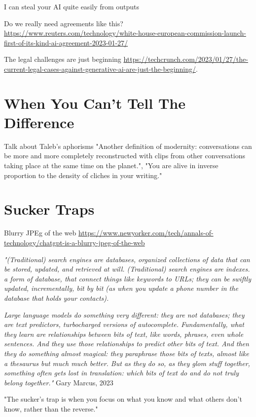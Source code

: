 I can steal your AI quite easily from outputs

Do we really need agreements like this? \url{https://www.reuters.com/technology/white-house-european-commission-launch-first-of-its-kind-ai-agreement-2023-01-27/}

The legal challenges are just beginning \url{https://techcrunch.com/2023/01/27/the-current-legal-cases-against-generative-ai-are-just-the-beginning/}.

\section{When You Can't Tell The Difference}

Talk about Taleb's aphorisms "Another definition of modernity: conversations can be more and more completely reconstructed with clips from other conversations taking place at the same time on the planet.", "You are alive in inverse proportion to the density of cliches in your writing."

\section{Sucker Traps}

Blurry JPEg of the web \url{https://www.newyorker.com/tech/annals-of-technology/chatgpt-is-a-blurry-jpeg-of-the-web}

\textit{"(Traditional) search engines are databases, organized collections of data that can be stored, updated, and retrieved at will. (Traditional) search engines are indexes. a form of database, that connect things like keywords to URLs; they can be swiftly updated, incrementally, bit by bit (as when you update a phone number in the database that holds your contacts).}

\textit{Large language models do something very different: they are not databases; they are text predictors, turbocharged versions of autocomplete. Fundamentally, what they learn are relationships between bits of text, like words, phrases, even whole sentences. And they use those relationships to predict other bits of text. And then they do something almost magical: they paraphrase those bits of texts, almost like a thesaurus but much much better. But as they do so, as they glom stuff together, something often gets lost in translation: which bits of text do and do not truly belong together."} Gary Marcus, 2023 \cite{marcus2023}

"The sucker's trap is when you focus on what you know and what others don't know, rather than the reverse."

